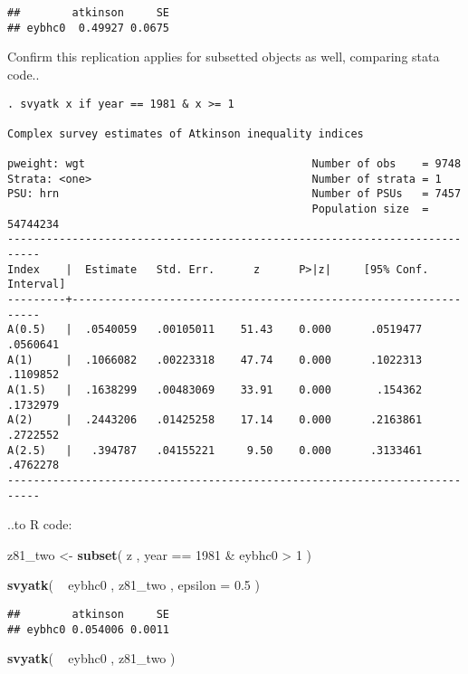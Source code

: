 \documentclass[]{book}
\newenvironment{Shaded}{\begin{snugshade}}{\end{snugshade}}
\newcommand{\KeywordTok}[1]{\textcolor[rgb]{0.13,0.29,0.53}{\textbf{{#1}}}}
\newcommand{\DataTypeTok}[1]{\textcolor[rgb]{0.13,0.29,0.53}{{#1}}}
\newcommand{\DecValTok}[1]{\textcolor[rgb]{0.00,0.00,0.81}{{#1}}}
\newcommand{\FloatTok}[1]{\textcolor[rgb]{0.00,0.00,0.81}{{#1}}}
\newcommand{\StringTok}[1]{\textcolor[rgb]{0.31,0.60,0.02}{{#1}}}
\newcommand{\NormalTok}[1]{{#1}}
\begin{document}
\begin{verbatim}
##        atkinson     SE
## eybhc0  0.49927 0.0675
\end{verbatim}

Confirm this replication applies for subsetted objects as well,
comparing stata code..

\begin{verbatim}
. svyatk x if year == 1981 & x >= 1

Complex survey estimates of Atkinson inequality indices
 
pweight: wgt                                   Number of obs    = 9748
Strata: <one>                                  Number of strata = 1
PSU: hrn                                       Number of PSUs   = 7457
                                               Population size  = 54744234
---------------------------------------------------------------------------
Index    |  Estimate   Std. Err.      z      P>|z|     [95% Conf. Interval]
---------+-----------------------------------------------------------------
A(0.5)   |  .0540059   .00105011    51.43    0.000      .0519477   .0560641
A(1)     |  .1066082   .00223318    47.74    0.000      .1022313   .1109852
A(1.5)   |  .1638299   .00483069    33.91    0.000       .154362   .1732979
A(2)     |  .2443206   .01425258    17.14    0.000      .2163861   .2722552
A(2.5)   |   .394787   .04155221     9.50    0.000      .3133461   .4762278
---------------------------------------------------------------------------
\end{verbatim}

..to R code:

\begin{Shaded}
\begin{Highlighting}[]
\NormalTok{z81_two <-}\StringTok{ }\KeywordTok{subset}\NormalTok{( z , year ==}\StringTok{ }\DecValTok{1981} \NormalTok{&}\StringTok{ }\NormalTok{eybhc0 >}\StringTok{ }\DecValTok{1} \NormalTok{)}

\KeywordTok{svyatk}\NormalTok{( ~}\StringTok{ }\NormalTok{eybhc0 , z81_two , }\DataTypeTok{epsilon =} \FloatTok{0.5} \NormalTok{)}
\end{Highlighting}
\end{Shaded}

\begin{verbatim}
##        atkinson     SE
## eybhc0 0.054006 0.0011
\end{verbatim}

\begin{Shaded}
\begin{Highlighting}[]
\KeywordTok{svyatk}\NormalTok{( ~}\StringTok{ }\NormalTok{eybhc0 , z81_two )}
\end{Highlighting}
\end{Shaded}
\end{document}

